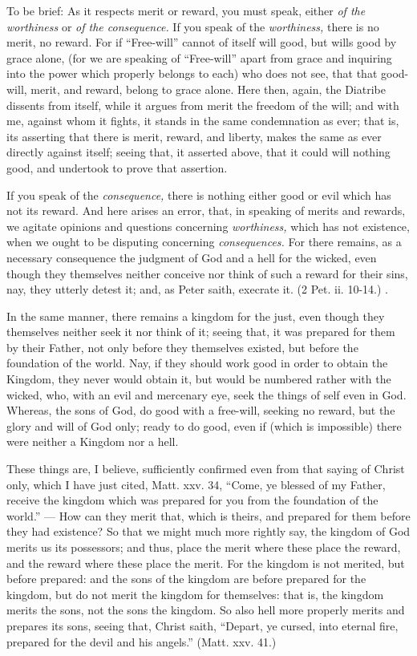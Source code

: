 To be brief: As it respects merit or reward, you must speak, either \emph{of the worthiness }or \emph{of the consequence. }If you speak of the \emph{worthiness, }there is no merit, no reward. For if “Free-will” cannot of itself will good, but wills good by grace alone, (for we are speaking of “Free-will” apart from grace and inquiring into the power which properly belongs to each) who does not see, that that good-will, merit, and reward, belong to grace alone. Here then, again, the Diatribe dissents from itself, while it argues from merit the freedom of the will; and with me, against whom it fights, it stands in the same condemnation as ever; that is, its asserting that there is merit, reward, and liberty, makes the same as ever directly against itself; seeing that, it asserted above, that it could will nothing good, and undertook to prove that assertion.

If you speak of the \emph{consequence, }there is nothing either good or evil which has not its reward. And here arises an error, that, in speaking of merits and rewards, we agitate opinions and questions concerning \emph{worthiness, }which has not existence, when we ought to be disputing concerning \emph{consequences. }For there remains, as a necessary consequence the judgment of God and a hell for the wicked, even though they themselves neither conceive nor think of such a reward for their sins, nay, they utterly detest it; and, as Peter saith, execrate it. (2 Pet. ii. 10-14.) .

In the same manner, there remains a kingdom for the just, even though they themselves neither seek it nor think of it; seeing that, it was prepared for them by their Father, not only before they themselves existed, but before the foundation of the world. Nay, if they should work good in order to obtain the Kingdom, they never would obtain it, but would be numbered rather with the wicked, who, with an evil and mercenary eye, seek the things of self even in God. Whereas, the sons of God, do good with a free-will, seeking no reward, but the glory and will of God only; ready to do good, even if (which is impossible) there were neither a Kingdom nor a hell.

These things are, I believe, sufficiently confirmed even from that saying of Christ only, which I have just cited, Matt. xxv. 34, “Come, ye blessed of my Father, receive the kingdom which was prepared for you from the foundation of the world.” — How can they merit that, which is theirs, and prepared for them before they had existence? So that we might much more rightly say, the kingdom of God merits us its possessors; and thus, place the merit where these place the reward, and the reward where these place the merit. For the kingdom is not merited, but before prepared: and the sons of the kingdom are before prepared for the kingdom, but do not merit the kingdom for themselves: that is, the kingdom merits the sons, not the sons the kingdom. So also hell more properly merits and prepares its sons, seeing that, Christ saith, “Depart, ye cursed, into eternal fire, prepared for the devil and his angels.” (Matt. xxv. 41.)

